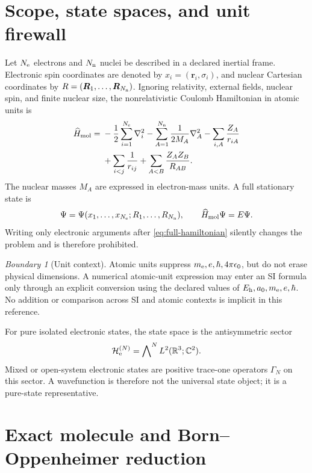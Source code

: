 \documentclass[11pt,a4paper]{article}
\theoremstyle{definition}
\theoremstyle{plain}
\theoremstyle{remark}
\newtheorem{warning}[definition]{Boundary}
\newcommand{\R}{\mathbb{R}}
\newcommand{\C}{\mathbb{C}}
\newcommand{\Hcal}{\mathcal H}
\begin{document}
\tableofcontents

\section{Scope, state spaces, and unit firewall}

Let \(N_{\rm e}\) electrons and \(N_{\rm n}\) nuclei be described in a
declared inertial frame.  Electronic spin coordinates are denoted by
\(x_i=(\bm r_i,\sigma_i)\), and nuclear Cartesian coordinates by
\(R=(\bm R_1,\ldots,\bm R_{N_{\rm n}})\).  Ignoring relativity,
external fields, nuclear spin, and finite nuclear size, the
nonrelativistic Coulomb Hamiltonian in atomic units is
\begin{equation}\label{eq:full-hamiltonian}
\begin{split}
\widehat H_{\rm mol}
={}&-\frac12\sum_{i=1}^{N_{\rm e}}\nabla_i^2
-\sum_{A=1}^{N_{\rm n}}\frac{1}{2M_A}\nabla_A^2
-\sum_{i,A}\frac{Z_A}{r_{iA}}\\
&+\sum_{i<j}\frac{1}{r_{ij}}
+\sum_{A<B}\frac{Z_AZ_B}{R_{AB}} .
\end{split}
\end{equation}
The nuclear masses \(M_A\) are expressed in electron-mass units.  A
full stationary state is
\begin{equation}\label{eq:full-state}
\Psi=\Psi(x_1,\ldots,x_{N_{\rm e}};R_1,\ldots,R_{N_{\rm n}}),
\qquad
\widehat H_{\rm mol}\Psi=E\Psi.
\end{equation}
Writing only electronic arguments after \cref{eq:full-hamiltonian}
silently changes the problem and is therefore prohibited.

\begin{warning}[Unit context]
Atomic units suppress \(m_{\rm e},e,\hbar,4\pi\epsilon_0\), but do not
erase physical dimensions.  A numerical atomic-unit expression may
enter an SI formula only through an explicit conversion using the
declared values of \(E_{\rm h},a_0,m_{\rm e},e,\hbar\).  No addition or
comparison across SI and atomic contexts is implicit in this
reference.
\end{warning}

For pure isolated electronic states, the state space is the
antisymmetric sector
\[
\Hcal_{\rm e}^{(N)}
=\bigwedge\nolimits^N
L^2(\R^3;\C^2).
\]
Mixed or open-system electronic states are positive trace-one
operators \(\Gamma_N\) on this sector.  A wavefunction is therefore
not the universal state object; it is a pure-state representative.

\section{Exact molecule and Born--Oppenheimer reduction}
\end{document}
